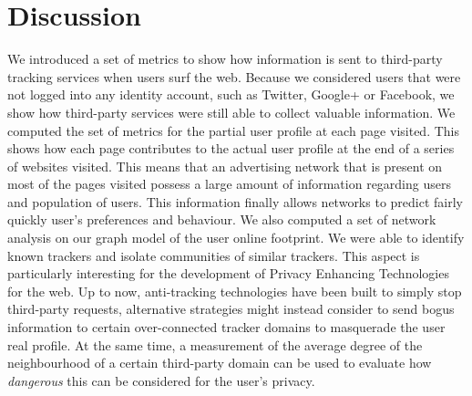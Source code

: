 \section{Discussion}
\noindent
We introduced a set of metrics to show how information is sent to third-party tracking services when users surf the web. Because we considered users that were not logged into any identity account, such as Twitter, Google+ or Facebook, we show how third-party services were still able to collect valuable information.
We computed the set of metrics for the partial user profile at each page visited. This shows how each page contributes to the actual user profile at the end of a series of websites visited. This means that an advertising network that is present on most of the pages visited possess a large amount of information regarding users and population of users. This information finally allows networks to predict fairly quickly user's preferences and behaviour.
We also computed a set of network analysis on our graph model of the user online footprint. We were able to identify known trackers and isolate communities of similar trackers. This aspect is particularly interesting for the development of Privacy Enhancing Technologies for the web. Up to now, anti-tracking technologies have been built to simply stop third-party requests, alternative strategies might instead consider to send bogus information to certain over-connected tracker domains to masquerade the user real profile. At the same time, a measurement of the average degree of the neighbourhood of a certain third-party domain can be used to evaluate how \emph{dangerous} this can be considered for the user's privacy.